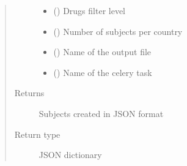 \documentclass[letterpaper,10pt,english]{sphinxmanual}
\begin{document}
\begin{fulllineitems}
\begin{quote}
\begin{description}
\begin{itemize}
\item {} 
\sphinxAtStartPar
{} () \textendash{} Drugs filter level

\item {} 
\sphinxAtStartPar
{} (\sphinxstyleliteralemphasis{\sphinxupquote{ (}}\sphinxstyleliteralemphasis{\sphinxupquote{, }}\sphinxstyleliteralemphasis{\sphinxupquote{) }}\sphinxstyleliteralemphasis{\sphinxupquote{ (}}\sphinxstyleliteralemphasis{\sphinxupquote{, }}\sphinxstyleliteralemphasis{\sphinxupquote{)}}) \textendash{} Number of subjects per country

\item {} 
\sphinxAtStartPar
{} () \textendash{} Name of the output file

\item {} 
\sphinxAtStartPar
{} () \textendash{} Name of the celery task

\end{itemize}

\item[{Returns}] \leavevmode
\sphinxAtStartPar
Subjects created in JSON format

\item[{Return type}] \leavevmode
\sphinxAtStartPar
JSON dictionary

\end{description}\end{quote}

\end{fulllineitems}

\end{document}
